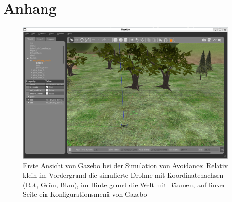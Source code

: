 \chapter{Anhang}
\begin{figure}[!ht]
    \centering
    \includegraphics[width=\linewidth]{images/sim_gazebo.png}
    \caption[Ansicht Gazebo Simulator]{Erste Ansicht von Gazebo bei der Simulation von Avoidance: Relativ klein im Vordergrund die simulierte Drohne mit Koordinatenachsen (Rot, Grün, Blau), im Hintergrund die Welt mit Bäumen, auf linker Seite ein Konfigurationsmenü von Gazebo}
    \label{fig:sim_gazebo}
\end{figure}